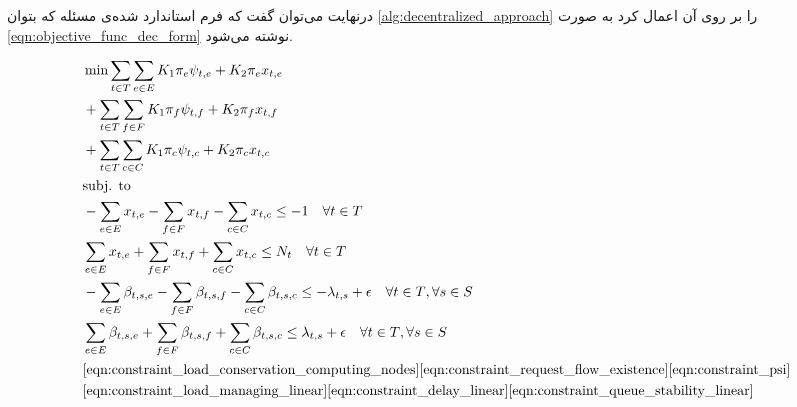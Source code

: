 	درنهایت می‌توان گفت که فرم استاندارد شده‌ی مسئله که بتوان \cref{alg:decentralized_approach} را بر روی آن اعمال کرد به صورت \cref{eqn:objective_func_dec_form} نوشته می‌شود. 
	
	\begin{align}
		&\min \sum_{t \in T}\sum_{e \in E} K_1\pi_e\psi_{t,e}+K_2\pi_ex_{t,e} \notag \\
		&+\sum_{t \in T}\sum_{f \in F} 	K_1\pi_f\psi_{t,f}+K_2\pi_fx_{t,f}\notag \\
		&+\sum_{t \in T}\sum_{c \in C} K_1\pi_c\psi_{t,c}+K_2\pi_cx_{t,c} \label{eqn:objective_func_dec_form} \notag \\
		&\text{subj. to} \notag \\
		&-\sum_{e \in E}x_{t,e} - \sum_{f \in F}x_{t,f} - \sum_{c \in C}x_{t,c} \le -1 \quad \forall{t \in T} \notag \\
		&\sum_{e \in E}x_{t,e} + \sum_{f \in F}x_{t,f} + \sum_{c \in C}x_{t,c} \le N_t \quad \forall{t \in T} \notag \\
		&-\sum_{e \in E} \beta_{t,s,e} - \sum_{f \in F} \beta_{t,s,f}
		-\sum_{c \in C}\beta_{t,s,c} \le -\lambda_{t,s}+\epsilon \quad \forall{t \in T}, \forall{s \in S} \notag \\ 
		&\sum_{e \in E} \beta_{t,s,e} + \sum_{f \in F} \beta_{t,s,f}
		+\sum_{c \in C}\beta_{t,s,c} \le \lambda_{t,s}+\epsilon \quad \forall{t \in T}, \forall{s \in S} \notag \\		
		&\cref{eqn:constraint_load_conservation_computing_nodes}
		\cref{eqn:constraint_request_flow_existence}				
		\cref{eqn:constraint_psi} \notag \\
		&\cref{eqn:constraint_load_managing_linear} 
		\cref{eqn:constraint_delay_linear}
		\cref{eqn:constraint_queue_stability_linear}
	\end{align}
	
